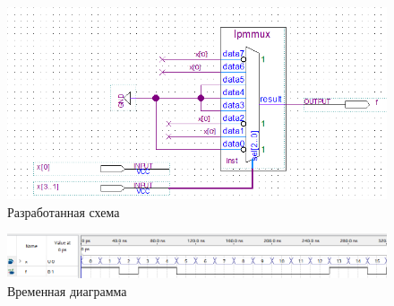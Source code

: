 \documentclass[a4paper,12pt]{article}
\begin{document}
    \begin{figure}[H]
        \centering
        \includegraphics[width=\linewidth]{scheme_logic}
        \caption{Разработанная схема}
    \end{figure}
    \begin{figure}[H]
        \centering
        \includegraphics[width=\linewidth]{wave_logic}
        \caption{Временная диаграмма}
    \end{figure}
\end{document}
